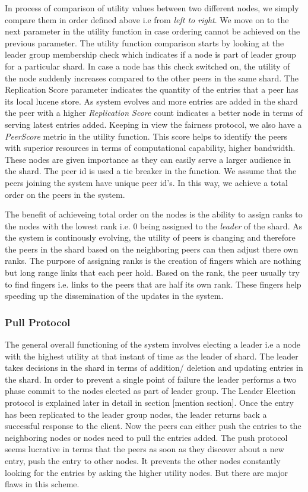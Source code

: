 \documentclass[a4paper, 11pt]{article}
\begin{document}
In process of comparison of utility values between two different nodes, we simply compare them in order defined above i.e from \textit {left to right}. We move on to the next parameter in the utility function in case ordering cannot be achieved on the previous parameter. The utility function comparison starts by looking at the leader group membership check which indicates if a node is part of leader group for a particular shard. In case a node has this check switched on, the utility of the node suddenly increases compared to the other peers in the same shard. The Replication Score parameter indicates the quantity of the entries that a peer has its local lucene store. As system evolves and more entries are added in the shard the peer with a higher \textit{Replication Score} count indicates a better node in terms of serving latest entries added. Keeping in view the fairness protocol, we also have a \textit{PeerScore} metric in the utility function. This score helps to identify the peers with superior resources in terms of computational capability, higher bandwidth. These nodes are given importance as they can easily serve a larger audience in the shard. The peer id is used a tie breaker in the function. We assume that the peers joining the system have unique peer id's.  In this way, we achieve a total order on the peers in the system.

\par The benefit of achieveing total order on the nodes is the ability to assign ranks to the nodes with the lowest rank i.e. 0 being assigned to the \textit{leader} of the shard. As the system is continously evolving, the utility of peers is changing and therefore the peers in the shard based on the neighboring peers can then adjust there own ranks. The purpose of assigning ranks is the creation of fingers which are nothing but long range links that each peer hold. Based on the rank, the peer usually try to find fingers i.e. links to the peers that are half its own rank. These fingers help speeding up the dissemination of the updates in the system.


\subsubsection*{Pull Protocol}

The general overall functioning of the system involves electing a leader i.e a node with the highest utility at that instant of time as the leader of shard. The leader takes decisions in the shard in terms of addition/ deletion and updating entries in the shard. In order to prevent a single point of failure the leader performs a two phase commit to the nodes elected as part of leader group. The Leader Election protocol is explained later in detail in section [mention section]. Once the entry has been replicated to the leader group nodes, the leader returns back a successful response to the client. Now the peers can either push the entries to the neighboring nodes or nodes need to pull the entries added. The push protocol seems lucrative in terms that the peers as soon as they discover about a new entry, push the entry to other nodes. It prevents the other nodes constantly looking for the entries by asking the higher utility nodes. But there are major flaws in this scheme.
\end{document}
